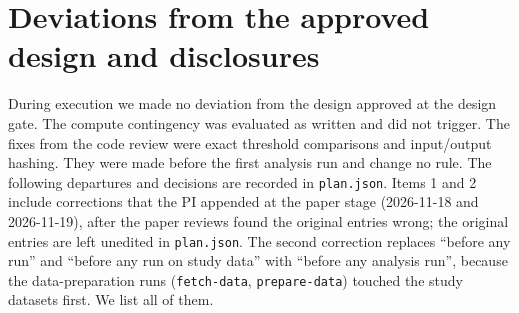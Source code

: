 \documentclass[11pt]{article}
\begin{document}
\section{Deviations from the approved design and disclosures}
\label{sec:deviations}

During execution we made no deviation from the design approved at the design gate. The
compute contingency was evaluated as written and did not trigger. The fixes from the code
review were exact threshold comparisons and input/output hashing. They were made before the
first analysis run and change no rule. The following departures and decisions are recorded
in \texttt{plan.json}. Items 1 and 2 include corrections that the PI appended at the paper
stage (2026-11-18 and 2026-11-19), after the paper reviews found the original entries
wrong; the original entries are left unedited in \texttt{plan.json}. The second correction
replaces ``before any run'' and ``before any run on study data'' with ``before any analysis
run'', because the data-preparation runs (\texttt{fetch-data}, \texttt{prepare-data})
touched the study datasets first. We list all of them.
\end{document}
